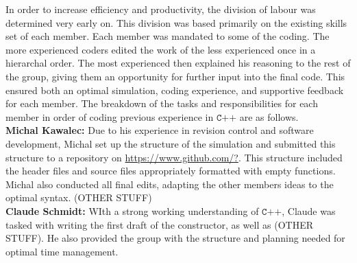 \documentclass[a4paper,11pt]{article}
\begin{document}
In order to increase efficiency and productivity, the division of labour was determined very early on.  This division was based primarily on the existing skills set of each member.  Each member was mandated to some of the coding.   The more experienced coders edited the work of the less experienced once in a hierarchal order.  The most experienced then explained his reasoning to the rest of the group, giving them an opportunity for further input into the final code.  This ensured both an optimal simulation, coding experience, and supportive feedback for each member.  The breakdown of the tasks and responsibilities for each member in order of coding previous experience in $\texttt{C++}$ are as follows.
\\

\noindent\textbf{Michal Kawalec:}  Due to his experience in revision control and software development, Michal set up the structure of the simulation and submitted this structure to a repository on \url{https://www.github.com/?}.  This structure included the header files and source files appropriately formatted with empty functions.  Michal also conducted all final edits, adapting the other members ideas to the optimal syntax.  (OTHER STUFF)
\\

\noindent\textbf{Claude  Schmidt:}   WIth a strong working understanding of $\texttt{C++}$, Claude was tasked with writing the first draft of the constructor, as well as (OTHER STUFF).  He also provided the group with the structure and planning needed for optimal time management.  
\\
\end{document}
